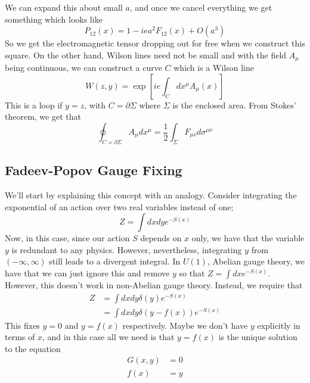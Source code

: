 \documentclass[11pt, oneside]{article}   	%
\theoremstyle{slanted}
\begin{document}
We can expand this about small $ a   $, 
and once we cancel everything we get  
something which looks like 
\[
	P _{ 12 } \left(  x  \right)   = 1 - i e a ^ 2 F _{ 12 } \left(  x  \right)  + O \left(  a ^ 3  \right)  
\] So we get the 
electromagnetic tensor dropping out 
for free when we construct this square. 
On the other hand, Wilson lines 
need not be small and with the field $A _ \mu $ being 
continuous, we can construct a curve $ C $ which 
is a Wilson line 
\[
	W\left( z, y  \right)    = \exp \left[  i e \int_ C dx ^ \mu A _ \mu \left(  x  \right)   \right]  
\]  This is a loop if 
$ y  = z $, with $ C   =\partial  \Sigma  $
where $ \Sigma $ is the enclosed area. 
From Stokes' theorem, we get that 
\[
 \oint_{C = \partial  \Sigma  } A _ \mu dx ^ \mu  = \frac{1}{2 } \int_{ \Sigma } F _{ \mu \nu } d \sigma ^{ \mu \nu }
\]

\subsection{Fadeev-Popov Gauge Fixing}
We'll start by explaining this 
concept with an analogy. Consider integrating 
the exponential of an action over 
two real variables instead of one; 
\[
	Z  = \int dx dy e ^{  - S \left(  x  \right)  } 
\] Now, in this case, since our 
action $ S $ depends on $ x  $ only, we have that 
the variable $ y $ is redundant to any physics. 
However, nevertheless, integrating $ y $ 
from $ \left(  - \infty, \infty  \right)  $  still 
leads to a divergent integral. 
In $ U \left(  1  \right)    $, Abelian gauge theory, we 
have that we can just ignore this and 
remove $ y $ so that $  Z = \int dx e ^{  - S \left(  x  \right)  } $. 
However, this doesn't work in non-Abelian gauge theory. 
Instead, we require that 
\begin{align*}
	Z &=  \int dx dy \delta \left( y  \right)  e ^{  - S\left( x  \right)  }  \\
	  &=  \int dx dy \delta \left( y  - f \left(  x  \right)   \right)  e ^{  - S\left(  x   \right)  } 
\end{align*}
This fixes $ y  =0 $ and $ y  = f\left(  x  \right)  $ respectively. 
Maybe we don't have $ y $ explicitly in terms of $ x $, 
and in this case all we need is that $ y  = f \left(  x  \right)  $
is the unique solution to the equation 
\begin{align*}
	 G \left( x , y  \right)   &=  0   \\ 
	 f \left(  x  \right)  &=  y  \\
\end{align*}
\end{document}
